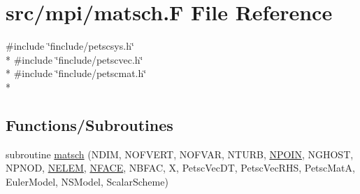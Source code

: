 \hypertarget{mpi_2matsch_8_f}{\section{src/mpi/matsch.F File Reference}
\label{mpi_2matsch_8_f}
}
{\ttfamily \#include \char`\"{}finclude/petscsys.\-h\char`\"{}}\\*
{\ttfamily \#include \char`\"{}finclude/petscvec.\-h\char`\"{}}\\*
{\ttfamily \#include \char`\"{}finclude/petscmat.\-h\char`\"{}}\\*
\subsection*{Functions/\-Subroutines}
\begin{DoxyCompactItemize}
\item 
subroutine \hyperlink{mpi_2matsch_8_f_a7896ab44e38f75125db87bccac7d273d}{matsch} (N\-D\-I\-M, N\-O\-F\-V\-E\-R\-T, N\-O\-F\-V\-A\-R, N\-T\-U\-R\-B, \hyperlink{mesh_8com_ae28c1572321efcd8715b974d87d20c58}{N\-P\-O\-I\-N}, N\-G\-H\-O\-S\-T, N\-P\-N\-O\-D, \hyperlink{mesh_8com_aee5e75b79d0e815c0603cfbccc618957}{N\-E\-L\-E\-M}, \hyperlink{mesh_8com_a78142d59d4cbb9fedbede16187658dd3}{N\-F\-A\-C\-E}, N\-B\-F\-A\-C, X, Petsc\-Vec\-D\-T, Petsc\-Vec\-R\-H\-S, Petsc\-Mat\-A, Euler\-Model, N\-S\-Model, Scalar\-Scheme)
\end{DoxyCompactItemize}


